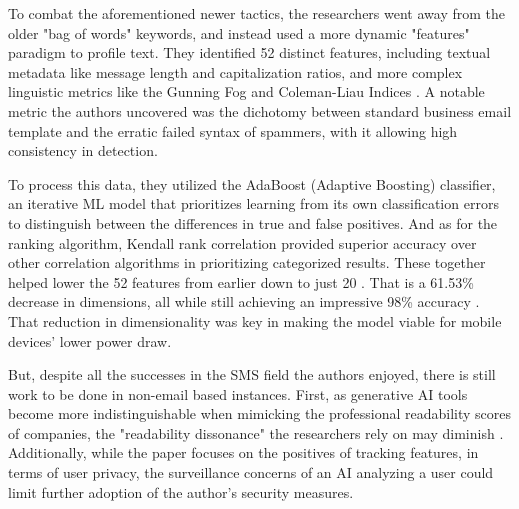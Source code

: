 \documentclass[conference]{IEEEtran}
\begin{document}
To combat the aforementioned newer tactics, the researchers went away from the older "bag of words" keywords, and instead used a more dynamic "features" paradigm to profile text.
They identified 52 distinct features, including textual metadata like message length and capitalization ratios, and more complex linguistic metrics like the Gunning Fog and Coleman-Liau Indices \cite{sonowal1}.
A notable metric the authors uncovered was the dichotomy between standard business email template and the erratic failed syntax of spammers, with it allowing high consistency in detection.

To process this data, they utilized the AdaBoost (Adaptive Boosting) classifier, an iterative ML model that prioritizes learning from its own classification errors to distinguish between the differences in true and false positives. 
And as for the ranking algorithm, Kendall rank correlation provided superior accuracy over other correlation algorithms in prioritizing categorized results. 
These together helped lower the 52 features from earlier down to just 20 .
That is a 61.53\% decrease in dimensions, all while still achieving an impressive 98\% accuracy \cite{sonowal1}.
That reduction in dimensionality was key in making the model viable for mobile devices' lower power draw.

But, despite all the successes in the SMS field the authors enjoyed, there is still work to be done in non-email based instances.
First, as generative AI tools become more indistinguishable when mimicking the professional readability scores of companies, the "readability dissonance" the researchers rely on may diminish \cite{sonowal1}.
Additionally, while the paper focuses on the positives of tracking features, in terms of user privacy, the surveillance concerns of an AI analyzing a user could limit further adoption of the author's security measures.
\end{document}
